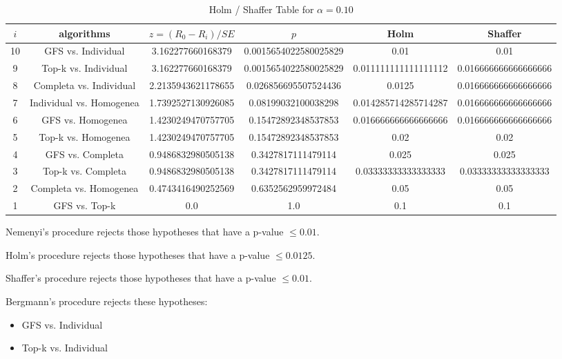 \documentclass[a4paper,10pt]{article}
\begin{document}
\begin{landscape}
\begin{table}[!htp]
\centering\tiny
\caption{Holm / Shaffer Table for $\alpha=0.10$}
\begin{tabular}{cccccc}
$i$&algorithms&$z=(R_0 - R_i)/SE$&$p$&Holm&Shaffer\\
\hline
10&GFS vs. Individual&3.162277660168379&0.0015654022580025829&0.01&0.01\\
9&Top-k vs. Individual&3.162277660168379&0.0015654022580025829&0.011111111111111112&0.016666666666666666\\
8&Completa vs. Individual&2.2135943621178655&0.026856695507524436&0.0125&0.016666666666666666\\
7&Individual vs. Homogenea&1.7392527130926085&0.08199032100038298&0.014285714285714287&0.016666666666666666\\
6&GFS vs. Homogenea&1.4230249470757705&0.15472892348537853&0.016666666666666666&0.016666666666666666\\
5&Top-k vs. Homogenea&1.4230249470757705&0.15472892348537853&0.02&0.02\\
4&GFS vs. Completa&0.9486832980505138&0.3427817111479114&0.025&0.025\\
3&Top-k vs. Completa&0.9486832980505138&0.3427817111479114&0.03333333333333333&0.03333333333333333\\
2&Completa vs. Homogenea&0.4743416490252569&0.6352562959972484&0.05&0.05\\
1&GFS vs. Top-k&0.0&1.0&0.1&0.1\\
\hline
\end{tabular}
\end{table}
Nemenyi's procedure rejects those hypotheses that have a p-value $\le0.01$.


Holm's procedure rejects those hypotheses that have a p-value $\le0.0125$.


Shaffer's procedure rejects those hypotheses that have a p-value $\le0.01$.


Bergmann's procedure rejects these hypotheses:


\begin{itemize}


\item GFS vs. Individual
\item Top-k vs. Individual
\end{itemize}



\end{landscape}
\end{document}
